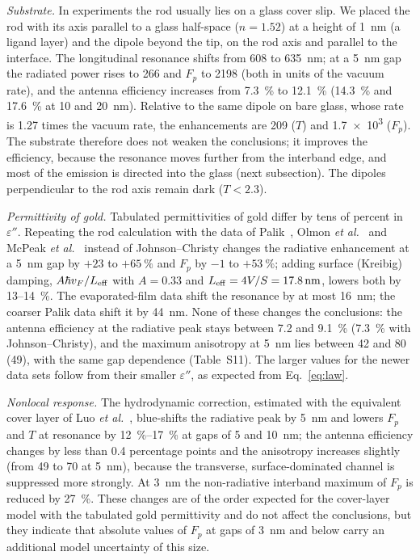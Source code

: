 \documentclass[11pt,a4paper]{article}
\newcommand{\Fp}{F_p}
\begin{document}
\emph{Substrate.} In experiments the rod usually lies on a glass cover slip. We placed the rod with its axis
parallel to a glass half-space ($n=1.52$) at a height of \SI{1}{nm} (a ligand layer) and the dipole beyond the tip,
on the rod axis and parallel to the interface. The longitudinal resonance shifts from 608 to \SI{635}{nm}; at a
\SI{5}{nm} gap the radiated power rises to 266 and $\Fp$ to 2198 (both in units of the vacuum rate), and the antenna
efficiency increases from \SI{7.3}{\percent} to \SI{12.1}{\percent} (\SI{14.3}{\percent} and \SI{17.6}{\percent} at
10 and \SI{20}{nm}). Relative to the same dipole on bare glass, whose rate is 1.27 times the vacuum rate, the
enhancements are 209 ($T$) and \num{1.7e3} ($\Fp$). The substrate therefore does not weaken the conclusions; it
improves the efficiency, because the resonance moves further from the interband edge, and most of the emission
is directed into the glass (next subsection). The dipoles perpendicular to the rod axis remain dark ($T<2.3$).

\emph{Permittivity of gold.} Tabulated permittivities of gold differ by tens of percent in $\varepsilon''$. Repeating
the rod calculation with the data of Palik~\cite{palik}, Olmon \emph{et al.}~\cite{olmon2012} and McPeak
\emph{et al.}~\cite{mcpeak2015} instead of Johnson--Christy changes the radiative enhancement at a \SI{5}{nm} gap by
$+23$ to $+\SI{65}{\percent}$ and $\Fp$ by $-1$ to $+\SI{53}{\percent}$; adding surface (Kreibig) damping,
$A\hbar v_F/L_{\rm eff}$ with $A=0.33$ and $L_{\rm eff}=4V/S=\SI{17.8}{nm}$, lowers both by 13--\SI{14}{\percent}. The
evaporated-film data shift the resonance by at most \SI{16}{nm}; the coarser Palik data shift it by \SI{44}{nm}. None of
these changes the conclusions: the antenna efficiency at the radiative peak stays between 7.2 and \SI{9.1}{\percent}
(\SI{7.3}{\percent} with Johnson--Christy), and the maximum anisotropy at \SI{5}{nm} lies between 42 and 80 (49), with
the same gap dependence (Table~S11). The larger values for the newer data sets follow from their smaller
$\varepsilon''$, as expected from Eq.~\eqref{eq:law}.

\emph{Nonlocal response.} The hydrodynamic correction, estimated with the equivalent cover layer of Luo
\emph{et al.}~\cite{luo2013,raza2015,mortensen}, blue-shifts the radiative peak by \SI{5}{nm} and lowers $\Fp$ and $T$
at resonance by \SIrange{12}{17}{\percent} at gaps of 5 and \SI{10}{nm}; the antenna efficiency changes by less than
0.4 percentage points and the anisotropy increases slightly (from 49 to 70 at \SI{5}{nm}), because the transverse,
surface-dominated channel is suppressed more strongly. At \SI{3}{nm} the non-radiative interband maximum of $\Fp$ is
reduced by \SI{27}{\percent}. These changes are of the order expected for the cover-layer model with the tabulated
gold permittivity and do not affect the conclusions, but they indicate that absolute values of $\Fp$ at gaps of
\SI{3}{nm} and below carry an additional model uncertainty of this size.
\end{document}
